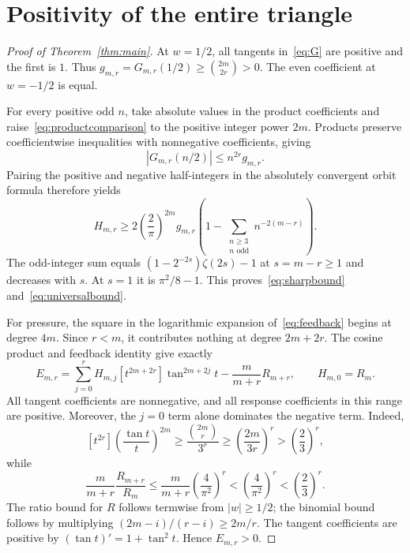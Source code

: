 \documentclass[11pt,a4paper]{article}
\theoremstyle{remark}\newtheorem*{ednote}{Editorial note (ProveIt, 2026-10-01)}
\begin{document}
\section{Positivity of the entire triangle}
\begin{proof}[Proof of Theorem~\ref{thm:main}]
At $w=1/2$, all tangents in~\eqref{eq:G} are positive and the first is $1$. Thus $g_{m,r}=G_{m,r}(1/2)\ge\binom{2m}{2r}>0$. The even coefficient at $w=-1/2$ is equal.

For every positive odd $n$, take absolute values in the product coefficients and raise~\eqref{eq:productcomparison} to the positive integer power $2m$. Products preserve coefficientwise inequalities with nonnegative coefficients, giving
\[
 |G_{m,r}(n/2)|\le n^{2r}g_{m,r}.
\]
Pairing the positive and negative half-integers in the absolutely convergent orbit formula therefore yields
\[
 H_{m,r}\ge2\left(\frac2\pi\right)^{2m}g_{m,r}
 \left(1-\sum_{\substack{n\ge3\\n\text{ odd}}}n^{-2(m-r)}\right).
\]
The odd-integer sum equals $(1-2^{-2s})\zeta(2s)-1$ at $s=m-r\ge1$ and decreases with $s$. At $s=1$ it is $\pi^2/8-1$. This proves~\eqref{eq:sharpbound} and~\eqref{eq:universalbound}.

For pressure, the square in the logarithmic expansion of~\eqref{eq:feedback} begins at degree $4m$. Since $r<m$, it contributes nothing at degree $2m+2r$. The cosine product and feedback identity give exactly
\begin{equation}\label{eq:pressuretransfer}
 E_{m,r}=\sum_{j=0}^r H_{m,j}
 [t^{2m+2r}]\tan^{2m+2j}t-\frac{m}{m+r}R_{m+r},
 \qquad H_{m,0}=R_m.
\end{equation}
All tangent coefficients are nonnegative, and all response coefficients in this range are positive. Moreover, the $j=0$ term alone dominates the negative term. Indeed,
\[
 [t^{2r}]\left(\frac{\tan t}{t}\right)^{2m}
 \ge\frac{\binom{2m}{r}}{3^r}
 \ge\left(\frac{2m}{3r}\right)^r>\left(\frac23\right)^r,
\]
while
\[
 \frac{m}{m+r}\frac{R_{m+r}}{R_m}
 \le\frac{m}{m+r}\left(\frac4{\pi^2}\right)^r
 <\left(\frac4{\pi^2}\right)^r<\left(\frac23\right)^r.
\]
The ratio bound for $R$ follows termwise from $|w|\ge1/2$; the binomial bound follows by multiplying $(2m-i)/(r-i)\ge2m/r$. The tangent coefficients are positive by $(\tan t)'=1+\tan^2t$. Hence $E_{m,r}>0$.
\end{proof}
\end{document}
